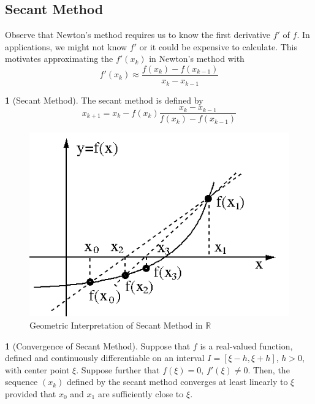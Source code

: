 \documentclass[12pt]{article}
\theoremstyle{definition}
\newtheorem{definition}{\color{NavyBlue}{\textbf{Definition}}}
\newtheorem{theorem}{\color{ForestGreen}{\textbf{Theorem}}}
\newcommand{\R}{\mathbb{R}}
\theoremstyle{definition}
\begin{document}
\subsection{Secant Method}
Observe that Newton's method requires us to know the first derivative $f'$ of $f$. In applications, we might not know $f'$ or it could be expensive to calculate. This motivates approximating the $f'(x_k)$ in Newton's method with
\begin{equation}
	f'(x_k) \approx \frac{f(x_k) - f(x_{k-1})}{x_k - x_{k-1}}
\end{equation}

\begin{definition}[Secant Method]
The secant method is defined by 
\begin{equation}
	x_{k+1} = x_k - f(x_k) \frac{x_k - x_{k-1}}{f(x_k) - f(x_{k-1})}
\end{equation}
\end{definition}

\begin{figure}[H]
	\begin{center}
		\includegraphics[scale=.5]{secant_method.png}
	\end{center}
	\caption{Geometric Interpretation of Secant Method in $\R$}
\end{figure}

\begin{theorem}[Convergence of Secant Method]
Suppose that $f$ is a real-valued function, defined and continuously differentiable on an interval $I = [\xi - h, \xi + h]$, $h > 0$, with center point $\xi$. Suppose further that $f(\xi) = 0$, $f'(\xi) \neq 0$. Then, the sequence $(x_k)$ defined by the secant method converges at least linearly to $\xi$ provided that $x_0$ and $x_1$ are sufficiently close to $\xi$. 
\end{theorem}
\end{document}
